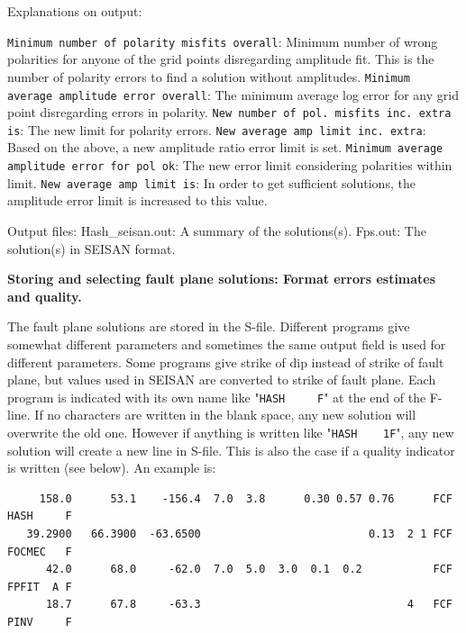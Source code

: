 Explanations on output:

\verb|Minimum number of polarity misfits overall|: 
Minimum number of wrong polarities for anyone of the grid points 
disregarding amplitude fit. This is the number of polarity errors 
to find a solution without amplitudes.   \newline
\verb|Minimum average amplitude error overall|: The minimum average log error for any grid point disregarding errors in polarity.\newline
\verb|New number of pol. misfits inc. extra is|: The new limit for polarity errors.     \newline
\verb|New average amp limit inc. extra|: Based on the above, a new amplitude ratio error limit is set.\newline
\verb|Minimum average amplitude error for pol ok|: The new error limit considering polarities within limit.\newline
\verb|New average amp limit is|: In order to get sufficient solutions, the amplitude error limit is increased to this value.\newline
             
Output files:
Hash\_seisan.out: A summary of the solutions(s).\newline
Fps.out: The solution(s) in SEISAN format.

\textbf{Storing and selecting fault plane solutions: Format errors estimates and quality.}

The fault plane solutions are stored in the S-file. Different programs give somewhat 
different parameters and sometimes the same output field is used for 
different parameters. Some programs give strike of dip instead of 
strike of fault plane, but values used in SEISAN are converted to 
strike of fault plane. Each program is indicated with its own name 
like "\verb|HASH     F|" at the end of the F-line. If no characters are 
written in the blank space, any new solution will overwrite the old 
one. However if anything is written like "\verb|HASH    1F|", any new solution 
will create a new line in S-file. This is also the case if a quality 
indicator is written (see below). An example is:

\begin{verbatim}
     158.0      53.1    -156.4  7.0  3.8      0.30 0.57 0.76      FCF HASH     F
   39.2900   66.3900  -63.6500                          0.13  2 1 FCF FOCMEC   F
      42.0      68.0     -62.0  7.0  5.0  3.0  0.1  0.2           FCF FPFIT  A F
      18.7      67.8     -63.3                                4   FCF PINV     F
\end{verbatim}

